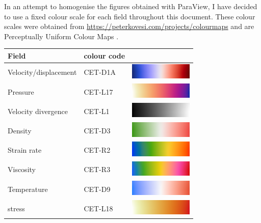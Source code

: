 In an attempt to homogenise the figures obtained with ParaView, I have decided to use 
a fixed colour scale for each field throughout this document. These colour scales were 
obtained from \url{https://peterkovesi.com/projects/colourmaps} and are 
Perceptually Uniform Colour Maps \cite{kove15}. 

\begin{center}
\begin{tabular}{lll}
\hline
Field & colour code & \\
\hline\hline
Velocity/displacement & CET-D1A & \includegraphics[width=3cm]{images/colourscales/CET-D1A}\\
\hline
Pressure& CET-L17 & \includegraphics[width=3cm]{images/colourscales/CET-L17}\\
\hline
Velocity divergence& CET-L1 & \includegraphics[width=3cm]{images/colourscales/CET-L1}\\
\hline
Density& CET-D3 & \includegraphics[width=3cm]{images/colourscales/CET-D3}\\
\hline
Strain rate& CET-R2 & \includegraphics[width=3cm]{images/colourscales/CET-R2}\\
\hline
Viscosity & CET-R3 & \includegraphics[width=3cm]{images/colourscales/CET-R3}\\
\hline
Temperature & CET-D9 & \includegraphics[width=3cm]{images/colourscales/CET-D9}\\
\hline
stress & CET-L18 &  \includegraphics[width=3cm]{images/colourscales/CET-L18}\\

\end{tabular}
\end{center}
